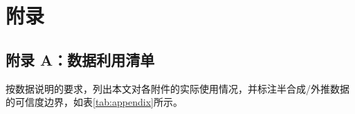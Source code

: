 \newpage
\makeatletter
\let\@oldaddcontentsline\addcontentsline
\renewcommand{\addcontentsline}[3]{}

\section*{附录}
\let\addcontentsline\@oldaddcontentsline
\makeatother

\renewcommand{\arraystretch}{1.2}

\subsection*{附录 A：数据利用清单}

按数据说明的要求，列出本文对各附件的实际使用情况，并标注半合成/外推数据的可信度边界，如表\ref{tab:appendix}所示。

